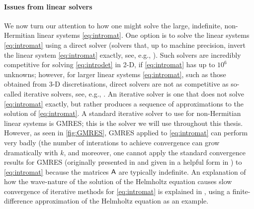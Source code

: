 \paragraph{Issues from linear solvers} We now turn our attention to how one might solve the large, indefinite, non-Hermitian linear systems \eqref{eq:intromat}. One option is to solve the linear systems \eqref{eq:intromat} using a direct solver (solvers that, up to machine precision, invert the linear system \eqref{eq:intromat} exactly, see, e.g., \cite{DuErRe:17}). Such solvers are incredibly competitive for solving \eqref{eq:introdet} in 2-D, if \eqref{eq:intromat} has up to $10^6$ unknowns; however, for larger linear systems \eqref{eq:intromat}, such as those obtained from 3-D discretisations, direct solvers are not as competitive as so-called iterative solvers, see, e.g., \cite[p. 70]{ElSiWa:14}. An iterative solver is one that does not solve \eqref{eq:intromat} exactly, but rather produces a sequence of approximations to the solution of \eqref{eq:intromat}. A standard iterative solver to use for non-Hermitian linear systems is GMRES; this is the solver we will use throughout this thesis. However, as seen in \cref{fig:GMRES}, GMRES applied to \eqref{eq:intromat} can perform very badly (the number of interations to achieve convergence can grow dramatically with $k$, and moreover, one cannot apply the standard convergence results for GMRES (originally presented in \cite{El:82} and given in a helpful form in \cite[Section 1]{BeGoTy:06}) to \eqref{eq:intromat} because the matrices $\mathsf{A}$ are typically indefinite. An explanation of how the wave-nature of the solution of the Helmholtz equation causes slow convergence of iterative methods for \eqref{eq:intromat} is explained in \cite[Section 2.1]{ErGa:12}, using a finite-difference approximation of the Helmholtz equation as an example.

